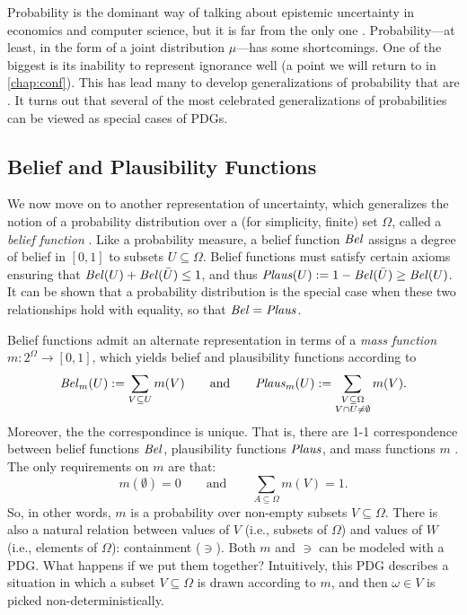Probability is the dominant way of talking about epistemic uncertainty
in economics and computer science, but it is far from the only one \cite{halpern-RAU}.
Probability---at least, in the form of a joint distribution $\mu$---has some shortcomings. 
One of the biggest is its inability to represent ignorance well
    (a point we will return to in \cref{chap:conf}).
This has lead many to develop generalizations of probability that are \cite{shafer1990probability,Walley1991-SRIP}.
It turns out that several of the most celebrated generalizations of probabilities can be viewed as special cases of PDGs. 


\subsection{Belief and Plausibility Functions}
    \label{sec:belplaus-as-pdg}
We now move on to another representation of uncertainty, which generalizes the notion of a probability distribution over a (for simplicity, finite) set $\Omega$, called a \emph{belief function} \cite{shafer1990probability}. 
Like a probability measure,
a belief function $\mathit{Bel}$ assigns a degree of belief in $[0,1]$ to subsets $U \subseteq \Omega$.  
Belief functions must satisfy certain axioms ensuring that $\mathit{Bel}(U) + \mathit{Bel}(\bar U) \le 1$, and thus $\mathit{Plaus}(U) := 1 - \mathit{Bel}(\bar U) \ge \mathit{Bel}(U)$. 
It can be shown that a probability distribution is the special case when these two relationships hold with equality, so that $\mathit{Bel} = \mathit{Plaus}$.  

Belief functions admit an alternate representation in terms of a \emph{mass function} $m : 2^\Omega \to [0,1]$, which yields belief and plausibility functions according to
\[
    \mathit{Bel}_m(U) := \sum_{V \subseteq U} m(V)
    \qquad\text{and}\qquad
    \mathit{Plaus}_m(U) := \sum_{\substack{V \subseteq \Omega \\ V \cap U \ne \emptyset}} m(V).
\]
Moreover, the the correspondince is unique.  That is, there are 1-1 correspondence between belief functions $\mathit{Bel}$, plausibility functions $\mathit{Plaus}$, and mass functions $m$ \cite[Thm 2.6.3]{halpern-RAU}. 
The only requirements on $m$ are that:
\[
m(\emptyset) = 0
\qquad\text{and}\qquad
\sum_{A \subseteq \Omega} m(V) = 1.
\]
So, in other words, $m$ is a probability over non-empty subsets $V \subseteq \Omega$. 
There is also a natural relation between values of $V$ (i.e., subsets of $\Omega$) and values of $W$ (i.e., elements of $\Omega$): containment ($\ni$). 
Both $m$ and $\ni$ can be modeled with a PDG. What happens if we put them together?
Intuitively, this PDG describes a situation in which a subset $V \subseteq \Omega$ is drawn according to $m$, and then $\omega \in V$ is picked non-deterministically.

